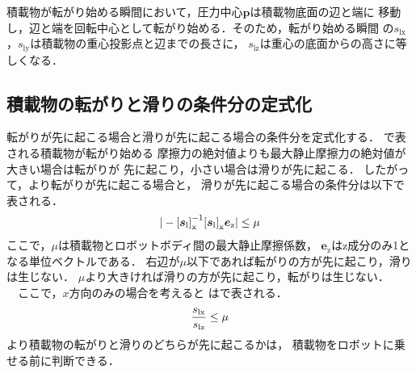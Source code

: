 積載物が転がり始める瞬間において，圧力中心$\bm{p}$は積載物底面の辺と端に
移動し，辺と端を回転中心として転がり始める．そのため，転がり始める瞬間
の${s}_{\mathrm{lx}}$，${s}_{\mathrm{ly}}$は積載物の重心投影点と辺までの長さに，
${s}_{\mathrm{lz}}$は重心の底面からの高さに等しくなる．\\

\subsection{積載物の転がりと滑りの条件分の定式化}
転がりが先に起こる場合と滑りが先に起こる場合の条件分を定式化する．
で表される積載物が転がり始める
摩擦力の絶対値よりも最大静止摩擦力の絶対値が大きい場合は転がりが
先に起こり，小さい場合は滑りが先に起こる．
したがって，より転がりが先に起こる場合と，
滑りが先に起こる場合の条件分は以下で表される．\\
\begin{eqnarray}
  \equlabel{1.2}
  |-{[\bm{s}_{\mathrm{l}}]}_{\mathrm{x}}^{-1}{[\bm{s}_{\mathrm{l}}]}_{\mathrm{x}}\bm{e}_{\mathrm{z}}|\leq{\mu}
\end{eqnarray}
ここで，$\mu$は積載物とロボットボディ間の最大静止摩擦係数，
$\bm{e}_{\mathrm{z}}$はz成分のみ1となる単位ベクトルである．
右辺が$\mu$以下であれば転がりの方が先に起こり，滑りは生じない．
$\mu$より大きければ滑りの方が先に起こり，転がりは生じない．\\
　ここで，$x$方向のみの場合を考えると
はで表される．\\
\begin{eqnarray}
  \equlabel{1.3}
  \frac{{s}_{\mathrm{lx}}}{{s}_{\mathrm{lz}}}\leq{\mu}
\end{eqnarray}
より積載物の転がりと滑りのどちらが先に起こるかは，
積載物をロボットに乗せる前に判断できる．

